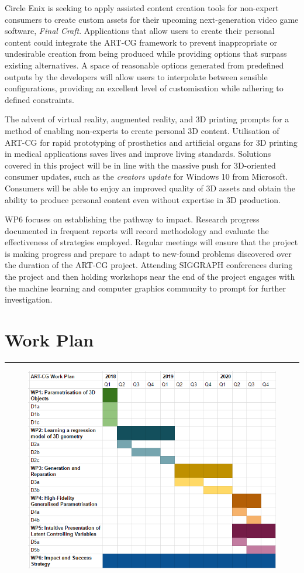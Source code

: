 \documentclass[a4paper, 11pt, onecolumn]{article} %
\numberwithin{equation}{section} %
\numberwithin{figure}{section} %
\numberwithin{table}{section} %
\begin{document}
Circle Enix is seeking to apply assisted content creation tools for non-expert consumers to create custom assets for their upcoming next-generation video game software, \textit{Final Craft}. Applications that allow users to create their personal content could integrate the ART-CG framework to prevent inappropriate or undesirable creation from being produced while providing options that surpass existing alternatives. A space of reasonable options generated from predefined outputs by the developers will allow users to interpolate between sensible configurations, providing an excellent level of customisation while adhering to defined constraints. 

The advent of virtual reality, augmented reality, and 3D printing prompts for a method of enabling non-experts to create personal 3D content. Utilisation of ART-CG for rapid prototyping of prosthetics and artificial organs for 3D printing in medical applications saves lives and improve living standards. Solutions covered in this project will be in line with the massive push for 3D-oriented consumer updates, such as the \textit{creators update} for Windows 10 from Microsoft. Consumers will be able to enjoy an improved quality of 3D assets and obtain the ability to produce personal content even without expertise in 3D production.

WP6 focuses on establishing the pathway to impact. Research progress documented in frequent reports will record methodology and evaluate the effectiveness of strategies employed. Regular meetings will ensure that the project is making progress and prepare to adapt to new-found problems discovered over the duration of the ART-CG project. Attending SIGGRAPH conferences during the project and then holding workshops near the end of the project engages with the machine learning and computer graphics community to prompt for further investigation.

\newpage

\section*{Work Plan}
\hrule\vspace{0.5em}

\begin{figure}[!h]
	\centering
	\includegraphics[scale=0.9]{images/workplan}\\
\end{figure}
\end{document}
